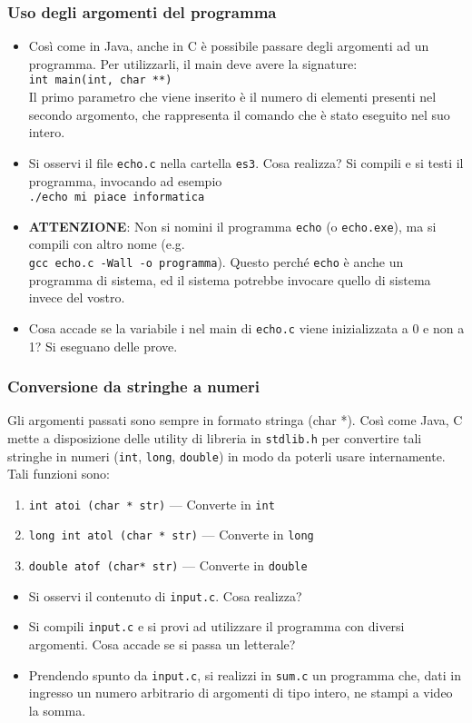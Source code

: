 \documentclass{beamer}
\begin{document}
\begin{frame}[fragile]
\frametitle{Uso degli argomenti del programma}
\begin{itemize}
 \item Così come in Java, anche in C è possibile passare degli argomenti ad un programma. Per utilizzarli, il main deve avere la signature: \\ \texttt{int main(int, char **)}\\ Il primo parametro che viene inserito è il numero di elementi presenti nel secondo argomento, che rappresenta il comando che è stato eseguito nel suo intero.
 \item Si osservi il file \texttt{echo.c} nella cartella \texttt{es3}. Cosa realizza? Si compili e si testi il programma, invocando ad esempio \\\texttt{./echo mi piace informatica}
 \item \textbf{ATTENZIONE}: Non si nomini il programma \texttt{echo} (o \texttt{echo.exe}), ma si compili con altro nome (e.g. \\ \texttt{gcc echo.c -Wall -o programma}). Questo perché \texttt{echo} è anche un programma di sistema, ed il sistema potrebbe invocare quello di sistema invece del vostro.
 \item Cosa accade se la variabile i nel main di \texttt{echo.c} viene inizializzata a 0 e non a 1? Si eseguano delle prove.
\end{itemize}
\end{frame}

\begin{frame}[fragile]
\frametitle{Conversione da stringhe a numeri}
Gli argomenti passati sono sempre in formato stringa (char *). Così come Java, C mette a disposizione delle utility di libreria in \texttt{stdlib.h} per convertire tali stringhe in numeri (\texttt{int}, \texttt{long}, \texttt{double}) in modo da poterli usare internamente. Tali funzioni sono:
\begin{enumerate}
 \item \texttt{int atoi (char * str)} --- Converte in \texttt{int}
 \item \texttt{long int atol (char * str)} --- Converte in \texttt{long}
 \item \texttt{double atof (char* str)} --- Converte in \texttt{double}
\end{enumerate}
\begin{itemize}
 \item Si osservi il contenuto di \texttt{input.c}. Cosa realizza?
 \item Si compili \texttt{input.c} e si provi ad utilizzare il programma con diversi argomenti. Cosa accade se si passa un letterale?
 \item Prendendo spunto da \texttt{input.c}, si realizzi in \texttt{sum.c} un programma che, dati in ingresso un numero arbitrario di argomenti di tipo intero, ne stampi a video la somma.
\end{itemize}
\end{frame}
\end{document}
